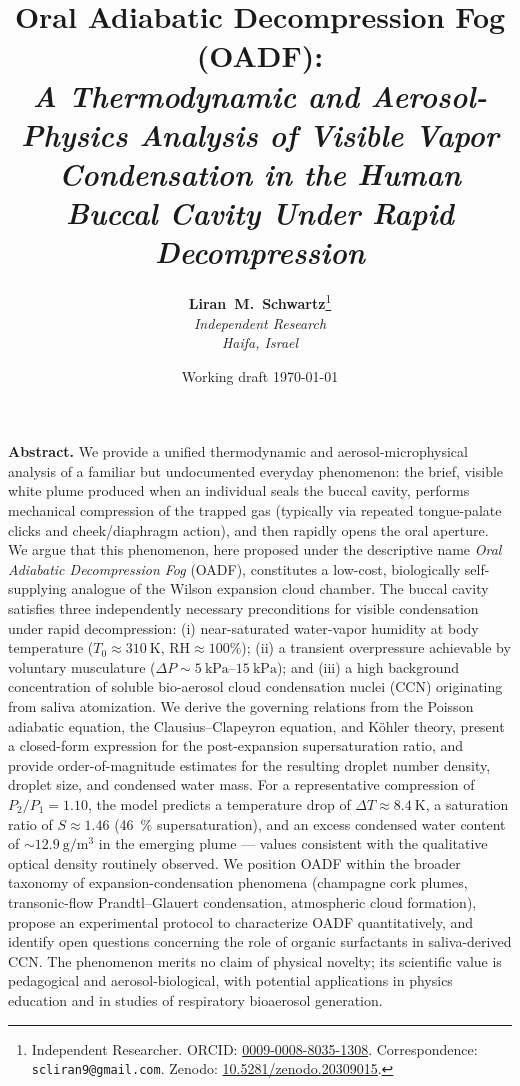 \documentclass[11pt,a4paper]{article}
\title{\vspace{-1.2cm}
\sffamily\bfseries
Oral Adiabatic Decompression Fog (OADF):\\[2pt]
\large\mdseries\itshape
A Thermodynamic and Aerosol-Physics Analysis of Visible Vapor Condensation in the Human Buccal Cavity Under Rapid Decompression
\vspace{-0.2cm}
}
\author{%
\textbf{Liran~M.~Schwartz}\thanks{Independent Researcher. ORCID: \href{https://orcid.org/0009-0008-8035-1308}{0009-0008-8035-1308}. Correspondence: \texttt{scliran9@gmail.com}. Zenodo: \href{https://doi.org/10.5281/zenodo.20309015}{10.5281/zenodo.20309015}.}\\[1pt]\small\itshape Independent Research\\
\small\itshape Haifa, Israel
}
\date{\small Working draft \textperiodcentered{} \today}
\theoremstyle{definition}
\theoremstyle{plain}
\begin{document}
\maketitle
\thispagestyle{empty}

\begin{center}
\begin{minipage}{0.92\textwidth}
\small
\noindent\textbf{Abstract.}\quad
We provide a unified thermodynamic and aerosol-microphysical analysis of a familiar but undocumented everyday phenomenon: the brief, visible white plume produced when an individual seals the buccal cavity, performs mechanical compression of the trapped gas (typically via repeated tongue-palate clicks and cheek/diaphragm action), and then rapidly opens the oral aperture. We argue that this phenomenon, here proposed under the descriptive name \emph{Oral Adiabatic Decompression Fog} (OADF), constitutes a low-cost, biologically self-supplying analogue of the Wilson expansion cloud chamber. The buccal cavity satisfies three independently necessary preconditions for visible condensation under rapid decompression: (i) near-saturated water-vapor humidity at body temperature ($T_0 \approx \SI{310}{\kelvin}$, $\mathrm{RH} \approx 100\%$); (ii) a transient overpressure achievable by voluntary musculature ($\Delta P \sim \SIrange{5}{15}{\kilo\pascal}$); and (iii) a high background concentration of soluble bio-aerosol cloud condensation nuclei (CCN) originating from saliva atomization. We derive the governing relations from the Poisson adiabatic equation, the Clausius–Clapeyron equation, and Köhler theory, present a closed-form expression for the post-expansion supersaturation ratio, and provide order-of-magnitude estimates for the resulting droplet number density, droplet size, and condensed water mass. For a representative compression of $P_2/P_1 = 1.10$, the model predicts a temperature drop of $\Delta T \approx \SI{8.4}{\kelvin}$, a saturation ratio of $S \approx 1.46$ (\SI{46}{\percent} supersaturation), and an excess condensed water content of $\sim\SI{12.9}{\gram\per\cubic\meter}$ in the emerging plume — values consistent with the qualitative optical density routinely observed. We position OADF within the broader taxonomy of expansion-condensation phenomena (champagne cork plumes, transonic-flow Prandtl–Glauert condensation, atmospheric cloud formation), propose an experimental protocol to characterize OADF quantitatively, and identify open questions concerning the role of organic surfactants in saliva-derived CCN. The phenomenon merits no claim of physical novelty; its scientific value is pedagogical and aerosol-biological, with potential applications in physics education and in studies of respiratory bioaerosol generation.


\end{minipage}
\end{center}
\end{document}
